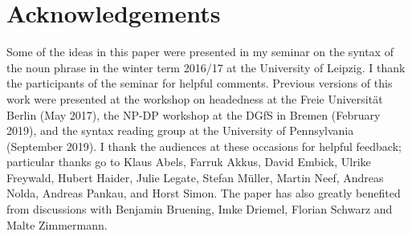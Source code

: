 \documentclass[output=paper,colorlinks,citecolor=black,
]{langscibook}
\begin{document}
\section*{Acknowledgements}

Some of the ideas in this paper were presented in my seminar on the syntax of the noun phrase in the winter term 2016/17 at the University of Leipzig. I thank the participants of the seminar for helpful comments. Previous versions of this work were presented at the workshop on headedness at the Freie Universität Berlin (May 2017), the NP-DP workshop at the DGfS in Bremen (February 2019), and the syntax reading group at the University of Pennsylvania (September 2019). I thank the audiences at these occasions for helpful feedback; particular thanks go to Klaus Abels, Farruk Akkus, David Embick, Ulrike Freywald, Hubert Haider, Julie Legate, Stefan Müller, Martin Neef, Andreas Nolda, Andreas Pankau, and Horst Simon. The paper has also greatly benefited from discussions with Benjamin Bruening, Imke Driemel, Florian Schwarz and Malte Zimmermann.

\printbibliography[heading=subbibliography,notkeyword=this]
\end{document}

